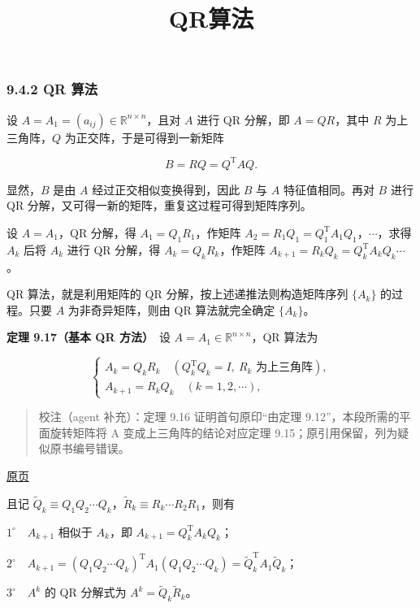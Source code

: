 \documentclass[
  10pt,
  fontset=fandol]{ctexart}
\title{QR算法}
\author{}
\date{}
\begin{document}
\maketitle

\subsubsection{9.4.2 QR 算法}\label{qr-ux7b97ux6cd5}

设 \(A=A_1=(a_{ij})\in\mathbb R^{n\times n}\)，且对 \(A\) 进行 QR 分解，即 \(A=QR\)，其中 \(R\) 为上三角阵，\(Q\) 为正交阵，于是可得到一新矩阵

\[
B=RQ=Q^{\mathrm T}AQ.
\]

显然，\(B\) 是由 \(A\) 经过正交相似变换得到，因此 \(B\) 与 \(A\) 特征值相同。再对 \(B\) 进行 QR 分解，又可得一新的矩阵，重复这过程可得到矩阵序列。

设 \(A=A_1\)，QR 分解，得 \(A_1=Q_1R_1\)，作矩阵 \(A_2=R_1Q_1=Q_1^{\mathrm T}A_1Q_1\)，\(\cdots\)，求得 \(A_k\) 后将 \(A_k\) 进行 QR 分解，得 \(A_k=Q_kR_k\)，作矩阵 \(A_{k+1}=R_kQ_k=Q_k^{\mathrm T}A_kQ_k\cdots\)。

QR 算法，就是利用矩阵的 QR 分解，按上述递推法则构造矩阵序列 \(\{A_k\}\) 的过程。只要 \(A\) 为非奇异矩阵，则由 QR 算法就完全确定 \(\{A_k\}\)。

\textbf{定理 9.17（基本 QR 方法）}　设 \(A=A_1\in\mathbb R^{n\times n}\)，QR 算法为

\[
\begin{cases}
A_k=Q_kR_k\quad(Q_k^{\mathrm T}Q_k=I,\ R_k\text{ 为上三角阵}),\\
A_{k+1}=R_kQ_k\quad(k=1,2,\cdots),
\end{cases}
\tag{9.4.8}
\]

\begin{quote}
校注（agent 补充）：定理 9.16 证明首句原印``由定理 9.12''，本段所需的平面旋转矩阵将 A 变成上三角阵的结论对应定理 9.15；原引用保留，列为疑似原书编号错误。
\end{quote}

\href{../../source-images/pdf-253.jpeg}{原页}

且记 \(\widetilde Q_k\equiv Q_1Q_2\cdots Q_k\)，\(\widetilde R_k\equiv R_k\cdots R_2R_1\)，则有

\(1^\circ\)　\(A_{k+1}\) 相似于 \(A_k\)，即 \(A_{k+1}=Q_k^{\mathrm T}A_kQ_k\)；

\(2^\circ\)　\(A_{k+1}=(Q_1Q_2\cdots Q_k)^{\mathrm T}A_1(Q_1Q_2\cdots Q_k)=\widetilde Q_k^{\mathrm T}A_1\widetilde Q_k\)；

\(3^\circ\)　\(A^k\) 的 QR 分解式为 \(A^k=\widetilde Q_k\widetilde R_k\)。
\end{document}
